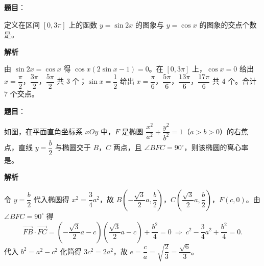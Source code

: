 \begin{answer}

\textbf{题目}：

定义在区间 \([0,3\pi]\) 上的函数 \(y=\sin 2x\) 的图象与 \(y=\cos x\) 的图象的交点个数是\gkblank{}。

\textbf{解析}

由 \(\sin 2x=\cos x\) 得 \(\cos x(2\sin x-1)=0\)。在 \([0,3\pi]\) 上，\(\cos x=0\) 给出 \(x=\dfrac{\pi}{2}\)，\(\dfrac{3\pi}{2}\)，\(\dfrac{5\pi}{2}\) 共 \(3\) 个；\(\sin x=\dfrac{1}{2}\) 给出 \(x=\dfrac{\pi}{6}\)，\(\dfrac{5\pi}{6}\)，\(\dfrac{13\pi}{6}\)，\(\dfrac{17\pi}{6}\) 共 \(4\) 个。合计 \(7\) 个交点。


\end{answer}
\begin{answer}

\textbf{题目}：

如图，在平面直角坐标系 \(xOy\) 中，\(F\) 是椭圆 \(\dfrac{x^{2}}{a^{2}}+\dfrac{y^{2}}{b^{2}}=1\)（\(a>b>0\)）的右焦点，直线 \(y=\dfrac{b}{2}\) 与椭圆交于 \(B\)，\(C\) 两点，且 \(\angle BFC=90^{\circ}\)，则该椭圆的离心率是\gkblank{}。
\nopagebreak[4]
\begin{center}\end{center}
\nopagebreak[4]
\textbf{解析}

令 \(y=\dfrac{b}{2}\) 代入椭圆得 \(x^{2}=\dfrac{3}{4}a^{2}\)，故 \(B\left(-\dfrac{\sqrt{3}}{2}a,\dfrac{b}{2}\right)\)，\(C\left(\dfrac{\sqrt{3}}{2}a,\dfrac{b}{2}\right)\)，\(F(c,0)\)。由 \(\angle BFC=90^{\circ}\) 得
\nopagebreak[4]
\[
\overrightarrow{FB}\cdot\overrightarrow{FC}=\left(-\frac{\sqrt{3}}{2}a-c\right)\left(\frac{\sqrt{3}}{2}a-c\right)+\frac{b^{2}}{4}=0
\ \Longrightarrow\ c^{2}-\frac{3}{4}a^{2}+\frac{b^{2}}{4}=0.
\]
代入 \(b^{2}=a^{2}-c^{2}\) 化简得 \(3c^{2}=2a^{2}\)，故 \(e=\dfrac{c}{a}=\sqrt{\dfrac{2}{3}}=\dfrac{\sqrt{6}}{3}\)。


\end{answer}
